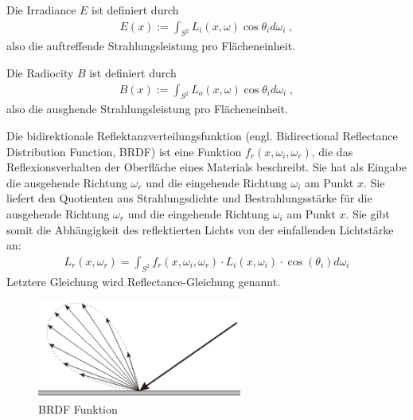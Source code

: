 \begin{Definition}
Die Irradiance $E$ ist definiert durch
\begin{align}
E(x) := \int_{S^2} L_i(x, \omega) \cos{\theta_i} d\omega_i \; ,
\end{align}
also die auftreffende Strahlungsleistung pro Flächeneinheit. 
\end{Definition}

\begin{Definition}
Die Radiocity $B$ ist definiert durch
\begin{align}
B(x) := \int_{S^2} L_o(x, \omega) \cos{\theta_i} d\omega_i \; ,
\end{align}
also die ausghende Strahlungsleistung pro Flächeneinheit. 
\end{Definition}



\begin{Definition}
Die  bidirektionale Reflektanzverteilungsfunktion (engl. Bidirectional Reflectance Distribution Function, BRDF)
ist eine Funktion $f_r (x, \omega_i, \omega_r)$, die das Reflexionsverhalten der Oberfläche eines Materials beschreibt. 
Sie hat als Eingabe die ausgehende Richtung $\omega_r$ und die eingehende Richtung  $\omega_i$ am Punkt $x$. 
Sie  liefert den Quotienten aus Strahlungsdichte und Bestrahlungsstärke für die ausgehende Richtung $\omega_r$ und die eingehende Richtung  $\omega_i$ am Punkt $x$.
Sie gibt somit die Abhängigkeit des reflektierten Lichts von der einfallenden Lichtstärke an: 
\begin{align}
L_r(x, \omega_r) = \int_{S^2}f_r (x, \omega_i, \omega_r) \cdot L_i(x, \omega_i) \cdot  \cos(\theta_i) d\omega_i
\end{align}
Letztere Gleichung wird  Reflectance-Gleichung genannt.
\end{Definition}
 \begin{figure}[H]
    \centering
    \includegraphics[width=0.6\textwidth]{images/brdf2.png}
    \caption{BRDF Funktion}
    \label{fig:raytracin_brdf}
\end{figure}


